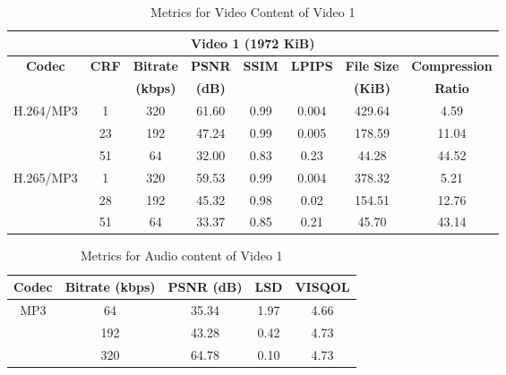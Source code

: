 \documentclass{ioereport}
\begin{document}
    \begin{table}[H]
        \centering
        \caption{Metrics for Video Content of Video 1}
        \label{table:vid-met-1}
        \begin{tabular}{|c|c|c|c|c|c|c|c|}
        \hline
        \multicolumn{8}{|c|}{\textbf{Video 1 (1972 KiB)}} \\ \hline
        \multirow{2}{*}{\textbf{Codec}} & \multirow{2}{*}{\textbf{CRF}} & \textbf{Bitrate} & \textbf{PSNR} & \textbf{SSIM} & \textbf{LPIPS} & \textbf{File Size} & \textbf{Compression} \\ 
        &  & \textbf{(kbps)} & \textbf{(dB)} &  &  & \textbf{(KiB)} & \textbf{Ratio} \\ \hline
        \multirow{3}{*}{H.264/MP3} & 1  & 320 & 61.60 & 0.99 & 0.004 & 429.64  & 4.59 \\ \cline{2-8} 
                                & 23 & 192 & 47.24 & 0.99 & 0.005 & 178.59  & 11.04 \\ \cline{2-8} 
                                & 51 & 64  & 32.00 & 0.83 & 0.23 & 44.28   & 44.52 \\ \hline
        \multirow{3}{*}{H.265/MP3} & 1  & 320 & 59.53 & 0.99 & 0.004 & 378.32  & 5.21 \\ \cline{2-8} 
                                & 28 & 192 & 45.32 & 0.98 & 0.02 & 154.51  & 12.76 \\ \cline{2-8} 
                                & 51 & 64  & 33.37 & 0.85 & 0.21 & 45.70   & 43.14 \\ \hline
        \end{tabular}
    \end{table}

    \begin{table}[H]
        \centering
        \caption{Metrics for Audio content of Video 1}
        \label{table:aud-met-1}
        \begin{tabular}{|c|c|c|c|c|}
        \hline
        \textbf{Codec} & \textbf{Bitrate (kbps)} & \textbf{PSNR (dB)} & \textbf{LSD} & \textbf{VISQOL} \\ \hline
        \multirow{3}{*}{MP3} & 64  & 35.34 & 1.97 & 4.66 \\ \cline{2-5} 
                                   & 192 & 43.28 & 0.42 & 4.73 \\ \cline{2-5} 
                                   & 320 & 64.78 & 0.10 & 4.73 \\ \hline
        \end{tabular}
    \end{table}
    
\end{document}
